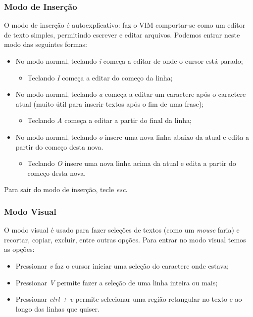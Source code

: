 \documentclass[12pt]{article}
\begin{document}
		\subsubsection{Modo de Inserção}
		O modo de inserção é autoexplicativo: faz o VIM comportar-se como um editor de texto simples, permitindo escrever e editar arquivos. Podemos entrar neste modo das seguintes formas:
		\begin{itemize}
			\item No modo normal, teclando \emph{i} começa a editar de onde o cursor está parado;
			\begin{itemize}
				\item Teclando \emph{I} começa a editar do começo da linha;
			\end{itemize}
			\item No modo normal, teclando \emph{a} começa a editar um caractere após o caractere atual (muito útil para inserir textos após o fim de uma frase);
			\begin{itemize}
				\item Teclando \emph{A} começa a editar a partir do final da linha;
			\end{itemize}
			\item No modo normal, teclando \emph{o} insere uma nova linha abaixo da atual e edita a partir do começo desta nova.
			\begin{itemize}
				\item Teclando \emph{O} insere uma nova linha acima da atual e edita a partir do começo desta nova.
			\end{itemize}
		\end{itemize}
		Para sair do modo de inserção, tecle \emph{esc}.
		\subsubsection{Modo Visual}
		O modo visual é usado para fazer seleções de textos (como um \emph{mouse} faria) e recortar, copiar, excluir, entre outras opções. Para entrar no modo visual temos as opções:
		\begin{itemize}
			\item Pressionar \emph{v} faz o cursor iniciar uma seleção do caractere onde estava;
			\item Pressionar \emph{V} permite fazer a seleção de uma linha inteira ou mais;
			\item Pressionar \emph{ctrl + v} permite selecionar uma região retangular no texto e ao longo das linhas que quiser.  
		\end{itemize}
\end{document}
